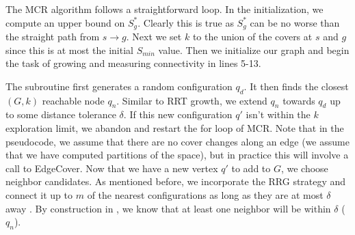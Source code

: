 {}

The MCR algorithm follows a straightforward loop. In the initialization, we compute an upper bound on $S^{*}_g$. Clearly this is true as $S^{*}_g$ can be no worse than the straight path from $s \rightarrow g$. Next we set $k$ to the union of the covers at $s$ and $g$ since this is at most the initial $S_{min}$ value. Then we initialize our graph and begin the task of growing and measuring connectivity in lines 5-13. 

The subroutine  first generates a random configuration $q_d$. It then finds the closest $(G,k)$ reachable node $q_n$. Similar to RRT growth, we extend $q_n$ towards $q_d$ up to some distance tolerance $\delta$. If this new configuration $q'$ isn't within the $k$ exploration limit, we abandon and restart the for loop of MCR. Note that in the pseudocode, we assume that there are no cover changes along an edge (we assume that we have computed partitions of the space), but in practice this will involve a call to EdgeCover. Now that we have a new vertex $q'$ to add to $G$, we choose neighbor candidates. As mentioned before, we incorporate the RRG strategy and connect it up to $m$ of the nearest configurations as long as they are at most $\delta$ away \cite{karaman:rrg}. By construction in , we know that at least one neighbor will be within $\delta$ ($q_n$). 

